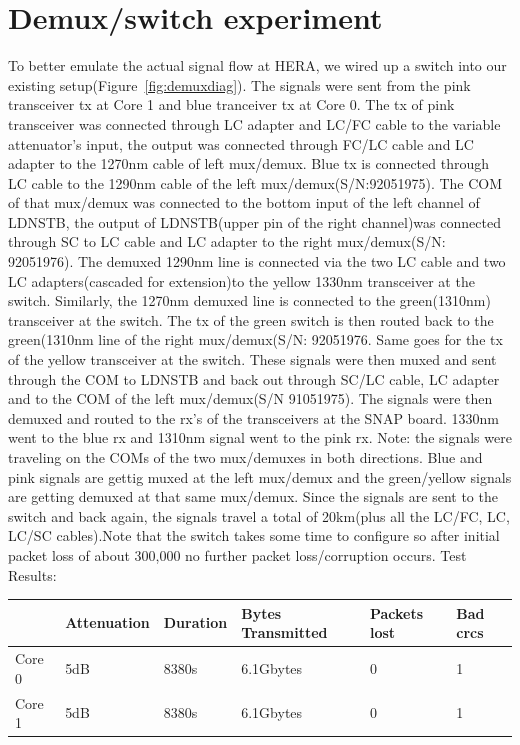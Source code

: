 \documentclass{article}
\begin{document}
\section*{Demux/switch experiment}
To better emulate the actual signal flow at HERA, we wired up a switch into our existing setup(Figure~\ref{fig:demuxdiag}). The signals were sent from the pink transceiver tx at Core 1 and blue tranceiver tx at Core 0. The tx of pink transceiver was connected through LC adapter and LC/FC cable to the variable attenuator's input, the output was connected through FC/LC cable and LC adapter to the 1270nm cable of left mux/demux. Blue tx is connected through LC cable to the 1290nm cable of the left mux/demux(S/N:92051975). The COM of that mux/demux was connected to the bottom input of the left channel of LDNSTB, the output of LDNSTB(upper pin of the right channel)was connected through SC to LC cable and LC adapter to the right mux/demux(S/N: 92051976). The demuxed 1290nm line is connected via the two LC cable and two LC adapters(cascaded for extension)to the yellow 1330nm transceiver at the switch. Similarly, the 1270nm demuxed line is connected to the green(1310nm) transceiver at the switch. The tx of the green switch is then routed back to the green(1310nm line of the right mux/demux(S/N: 92051976. Same goes for the tx of the yellow transceiver at the switch. These signals were then muxed and sent through the COM to LDNSTB and back out through SC/LC cable, LC adapter and to the COM of the left mux/demux(S/N 91051975). The signals were then demuxed and routed to the rx's of the transceivers at the SNAP board. 1330nm went to the blue rx and 1310nm signal went to the pink rx. Note: the signals were traveling on the COMs of the two mux/demuxes in both directions. Blue and pink signals are gettig muxed at the left mux/demux and the green/yellow signals are getting demuxed at that same mux/demux. Since the signals are sent to the switch and back again, the signals travel a total of 20km(plus all the LC/FC, LC, LC/SC cables).Note that the switch takes some time to configure so after initial packet loss of about 300,000 no further packet loss/corruption occurs. 
Test Results:
\begin{center}
\begin{tabular}{|l|l|l|l|l|p{2cm}|}
	\hline
	& Attenuation & Duration & Bytes Transmitted & Packets lost & Bad crcs \\ \hline
	Core 0 & 5dB & 8380s & 6.1Gbytes & 0 & 1 \\ \hline
	Core 1 & 5dB & 8380s & 6.1Gbytes & 0 & 1 \\ \hline
\end{tabular}	
\end{center}
\end{document}
